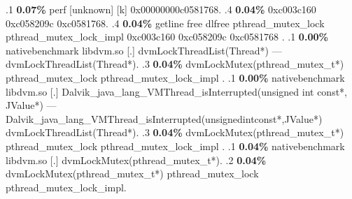 \begin{profile}
{.1 \textbf{ 0.07\%} perf             [unknown]              [k] 0x00000000c0581768. 
.4 \textbf{0.04\%} 0xc003c160\newline {} 0xc058209c\newline {} 0xc0581768. 
.4 \textbf{0.04\%} getline\newline {} free\newline {} dlfree\newline {} pthread\_mutex\_lock\newline {} pthread\_mutex\_lock\_impl\newline {} 0xc003c160\newline {} 0xc058209c\newline {} 0xc0581768\newline {} . 
.1 \textbf{ 0.00\%} nativebenchmark  libdvm.so              [.] dvmLockThreadList(Thread*)\newline {} ---dvmLockThreadList(Thread*). 
.3 \textbf{0.04\%} dvmLockMutex(pthread\_mutex\_t*)\newline {} pthread\_mutex\_lock\newline {} pthread\_mutex\_lock\_impl\newline {} . 
.1 \textbf{ 0.00\%} nativebenchmark  libdvm.so              [.] Dalvik\_java\_lang\_VMThread\_isInterrupted(unsigned int const*, JValue*)\newline {} ---Dalvik\_java\_lang\_VMThread\_isInterrupted(unsignedintconst*,JValue*)\newline {} dvmLockThreadList(Thread*). 
.3 \textbf{0.04\%} dvmLockMutex(pthread\_mutex\_t*)\newline {} pthread\_mutex\_lock\newline {} pthread\_mutex\_lock\_impl\newline {} . 
.1 \textbf{ 0.04\%} nativebenchmark  libdvm.so              [.] dvmLockMutex(pthread\_mutex\_t*). 
.2 \textbf{0.04\%} dvmLockMutex(pthread\_mutex\_t*)\newline {} pthread\_mutex\_lock\newline {} pthread\_mutex\_lock\_impl. 
}
\end{profile}
